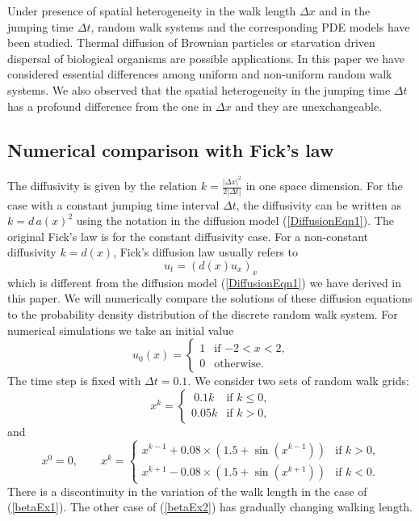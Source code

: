 \documentclass[11pt]{amsart}
\def\d{d}
\begin{document}
Under presence of spatial heterogeneity in the walk length $\Delta x$ and in the jumping time $\Delta t$, random walk systems and the corresponding PDE models have been studied. Thermal diffusion of Brownian particles or starvation driven dispersal of biological organisms are possible applications. In this paper we have considered essential differences among uniform and non-uniform random walk systems. We also observed that the spatial heterogeneity in the jumping time $\Delta t$ has a profound difference from the one in $\Delta x$ and they are unexchangeable.

\subsection{Numerical comparison with Fick's law}

The diffusivity is given by the relation $k=\frac{|\Delta x|^2}{2|\Delta t|}$ in one space dimension. For the case with a constant jumping time interval $\Delta t$, the diffusivity can be written as $k=\d\,a(x)^2$ using the notation in the diffusion model (\ref{DiffusionEqn1}). The original Fick's law \cite{Fick1855} is for the constant diffusivity case. For a non-constant diffusivity $k=d(x)$, Fick's diffusion law usually refers to
\begin{equation}\label{FicksLaw}
u_t=(d(x) u_x)_x
\end{equation}
which is different from the diffusion model (\ref{DiffusionEqn1}) we have derived in this paper. We will numerically compare the solutions of these diffusion equations to the probability density distribution of the discrete random walk system. For numerical simulations we take an initial value
\[
u_0(x)=
\begin{cases}
1 & \text{if $-2<x<2$,}\\
0 & \text{otherwise.}
\end{cases}
\]
The time step is fixed with $\Delta t=0.1$. We consider two sets of random walk grids:
\begin{equation}\label{betaEx1}
x^k=
\begin{cases}
~0.1k & \text{if $k\le0$,}\\
0.05k & \text{if $k>0$,}
\end{cases}
\end{equation}
and
\begin{equation}\label{betaEx2}
x^0=0,\qquad
x^k=
\begin{cases}
x^{k-1}+0.08\times(1.5+\sin(x^{k-1})) & \text{if $k>0$,}\\
x^{k+1}-0.08\times(1.5+\sin(x^{k+1})) & \text{if $k<0$.}
\end{cases}
\end{equation}
There is a discontinuity in the variation of the walk length in the case of (\ref{betaEx1}). The other case of (\ref{betaEx2}) has gradually changing walking length.
\end{document}
